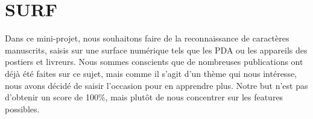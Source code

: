 \chapter{SURF}

Dans ce mini-projet, nous souhaitons faire de la reconnaissance de caractères manuscrits, saisis sur une surface numérique tels que les PDA ou les appareils des postiers et livreurs. Nous sommes conscients que de nombreuses publications ont déjà été faites sur ce sujet, mais comme il s'agit d'un thème qui nous intéresse, nous avons décidé de saisir l'occasion pour en apprendre plus. Notre but n'est pas d'obtenir un score de 100\%, mais plutôt de nous concentrer sur les features possibles.